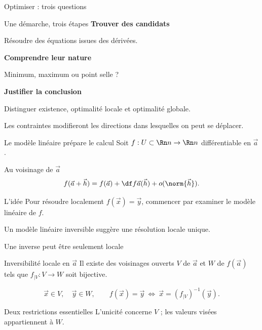 \begin{frame}[t]{Optimiser : trois questions}
\coursanalyse
\begin{cours}{Une démarche, trois étapes}
\textbf{Trouver des candidats}\par Résoudre des équations issues des dérivées.
\medskip\par\textbf{Comprendre leur nature}\par Minimum, maximum ou point selle ?
\medskip\par\textbf{Justifier la conclusion}\par Distinguer existence, optimalité locale et optimalité globale.
\end{cours}\vfill Les contraintes modifieront les directions dans lesquelles on peut se déplacer.
\end{frame}

\begin{frame}[t]{Le modèle linéaire prépare le calcul}
\coursanalyse
Soit $f:U\subset\Rn n\to\Rn n$ différentiable en $\vec a$.
\begin{notion}{Au voisinage de $\vec a$}
\[f(\vec a+\vec h)=f(\vec a)+\df f{\vec a}(\vec h)+o(\norm{\vec h}).\]
\end{notion}
\begin{resultat}{L’idée}
Pour résoudre localement $f(\vec x)=\vec y$, commencer par examiner le modèle linéaire de $f$.
\end{resultat}\vfill Un modèle linéaire inversible suggère une résolution locale unique.
\end{frame}

\begin{frame}[t]{Une inverse peut être seulement locale}
\coursanalyse
\begin{notion}{Inversibilité locale en $\vec a$}
Il existe des voisinages ouverts $V$ de $\vec a$ et $W$ de $f(\vec a)$ tels que $f_{|V}:V\to W$ soit bijective.
\end{notion}
\[\vec x\in V,\quad \vec y\in W,\qquad f(\vec x)=\vec y\ \Longleftrightarrow\ \vec x=(f_{|V})^{-1}(\vec y).\]
\vfill\begin{resultat}{Deux restrictions essentielles}
L’unicité concerne $V$ ; les valeurs visées appartiennent à $W$.
\end{resultat}
\end{frame}

